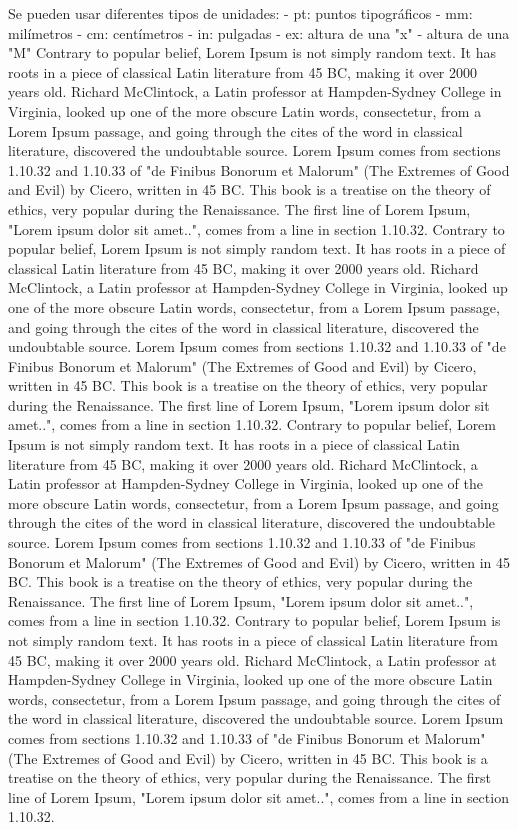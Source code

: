 \documentclass[12pt,letterpaper]{article} %
\begin{document}
Se pueden usar diferentes tipos de unidades:
- pt: puntos tipográficos
- mm: milímetros
- cm: centímetros
- in: pulgadas
- ex: altura de una "x"
- altura de una "M"
Contrary to popular belief, Lorem Ipsum is not simply random text. It has roots in a piece of classical Latin literature from 45 BC, making it over 2000 years old. Richard McClintock, a Latin professor at Hampden-Sydney College in Virginia, looked up one of the more obscure Latin words, consectetur, from a Lorem Ipsum passage, and going through the cites of the word in classical literature, discovered the undoubtable source. Lorem Ipsum comes from sections 1.10.32 and 1.10.33 of "de Finibus Bonorum et Malorum" (The Extremes of Good and Evil) by Cicero, written in 45 BC. This book is a treatise on the theory of ethics, very popular during the Renaissance. The first line of Lorem Ipsum, "Lorem ipsum dolor sit amet..", comes from a line in section 1.10.32.
Contrary to popular belief, Lorem Ipsum is not simply random text. It has roots in a piece of classical Latin literature from 45 BC, making it over 2000 years old. Richard McClintock, a Latin professor at Hampden-Sydney College in Virginia, looked up one of the more obscure Latin words, consectetur, from a Lorem Ipsum passage, and going through the cites of the word in classical literature, discovered the undoubtable source. Lorem Ipsum comes from sections 1.10.32 and 1.10.33 of "de Finibus Bonorum et Malorum" (The Extremes of Good and Evil) by Cicero, written in 45 BC. This book is a treatise on the theory of ethics, very popular during the Renaissance. The first line of Lorem Ipsum, "Lorem ipsum dolor sit amet..", comes from a line in section 1.10.32.
Contrary to popular belief, Lorem Ipsum is not simply random text. It has roots in a piece of classical Latin literature from 45 BC, making it over 2000 years old. Richard McClintock, a Latin professor at Hampden-Sydney College in Virginia, looked up one of the more obscure Latin words, consectetur, from a Lorem Ipsum passage, and going through the cites of the word in classical literature, discovered the undoubtable source. Lorem Ipsum comes from sections 1.10.32 and 1.10.33 of "de Finibus Bonorum et Malorum" (The Extremes of Good and Evil) by Cicero, written in 45 BC. This book is a treatise on the theory of ethics, very popular during the Renaissance. The first line of Lorem Ipsum, "Lorem ipsum dolor sit amet..", comes from a line in section 1.10.32.
Contrary to popular belief, Lorem Ipsum is not simply random text. It has roots in a piece of classical Latin literature from 45 BC, making it over 2000 years old. Richard McClintock, a Latin professor at Hampden-Sydney College in Virginia, looked up one of the more obscure Latin words, consectetur, from a Lorem Ipsum passage, and going through the cites of the word in classical literature, discovered the undoubtable source. Lorem Ipsum comes from sections 1.10.32 and 1.10.33 of "de Finibus Bonorum et Malorum" (The Extremes of Good and Evil) by Cicero, written in 45 BC. This book is a treatise on the theory of ethics, very popular during the Renaissance. The first line of Lorem Ipsum, "Lorem ipsum dolor sit amet..", comes from a line in section 1.10.32.
\end{document}
